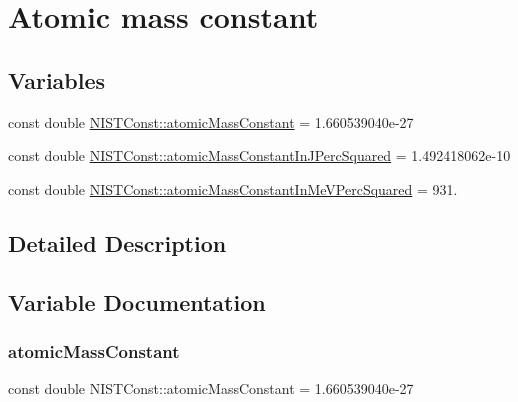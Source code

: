 \hypertarget{group___n_i_s_t_const-_atomic_mass_constant}{}\section{Atomic mass constant}
\label{group___n_i_s_t_const-_atomic_mass_constant}
\subsection*{Variables}
\begin{DoxyCompactItemize}
\item 
const double \mbox{\hyperlink{group___n_i_s_t_const-_atomic_mass_constant_ga2c815ce73f942601621223bef09be40a}{N\+I\+S\+T\+Const\+::atomic\+Mass\+Constant}} = 1.\+660539040e-\/27
\item 
const double \mbox{\hyperlink{group___n_i_s_t_const-_atomic_mass_constant_ga59e3df8073f8ba5570bc3c9308655215}{N\+I\+S\+T\+Const\+::atomic\+Mass\+Constant\+In\+J\+Perc\+Squared}} = 1.\+492418062e-\/10
\item 
const double \mbox{\hyperlink{group___n_i_s_t_const-_atomic_mass_constant_ga8bf06e408e84fc35515a4d6564407467}{N\+I\+S\+T\+Const\+::atomic\+Mass\+Constant\+In\+Me\+V\+Perc\+Squared}} = 931.
\end{DoxyCompactItemize}


\subsection{Detailed Description}


\subsection{Variable Documentation}
\mbox{\label{group___n_i_s_t_const-_atomic_mass_constant_ga2c815ce73f942601621223bef09be40a}} 
\subsubsection{\texorpdfstring{atomic\+Mass\+Constant}{atomicMassConstant}}
{\footnotesize\ttfamily const double N\+I\+S\+T\+Const\+::atomic\+Mass\+Constant = 1.\+660539040e-\/27}


